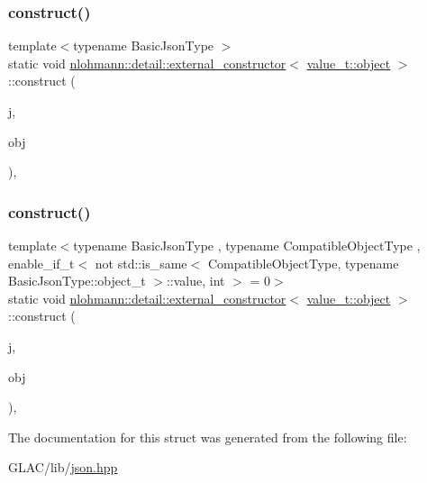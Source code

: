 \subsubsection{\texorpdfstring{construct()}{construct()}\hspace{0.1cm}{\footnotesize\ttfamily [1/2]}}
{\footnotesize\ttfamily template$<$typename Basic\+Json\+Type $>$ \\
static void \mbox{\hyperlink{structnlohmann_1_1detail_1_1external__constructor}{nlohmann\+::detail\+::external\+\_\+constructor}}$<$ \mbox{\hyperlink{namespacenlohmann_1_1detail_a90aa5ef615aa8305e9ea20d8a947980faa8cfde6331bd59eb2ac96f8911c4b666}{value\+\_\+t\+::object}} $>$\+::construct (\begin{DoxyParamCaption}\item[{Basic\+Json\+Type \&}]{j,  }\item[{const typename Basic\+Json\+Type\+::object\+\_\+t \&}]{obj }\end{DoxyParamCaption})\hspace{0.3cm}{\ttfamily [inline]}, {\ttfamily [static]}}

\mbox{\label{structnlohmann_1_1detail_1_1external__constructor_3_01value__t_1_1object_01_4_a91f89abe0ec4dec59099b691682ff927}} 
\subsubsection{\texorpdfstring{construct()}{construct()}\hspace{0.1cm}{\footnotesize\ttfamily [2/2]}}
{\footnotesize\ttfamily template$<$typename Basic\+Json\+Type , typename Compatible\+Object\+Type , enable\+\_\+if\+\_\+t$<$ not std\+::is\+\_\+same$<$ Compatible\+Object\+Type, typename Basic\+Json\+Type\+::object\+\_\+t $>$\+::value, int $>$  = 0$>$ \\
static void \mbox{\hyperlink{structnlohmann_1_1detail_1_1external__constructor}{nlohmann\+::detail\+::external\+\_\+constructor}}$<$ \mbox{\hyperlink{namespacenlohmann_1_1detail_a90aa5ef615aa8305e9ea20d8a947980faa8cfde6331bd59eb2ac96f8911c4b666}{value\+\_\+t\+::object}} $>$\+::construct (\begin{DoxyParamCaption}\item[{Basic\+Json\+Type \&}]{j,  }\item[{const Compatible\+Object\+Type \&}]{obj }\end{DoxyParamCaption})\hspace{0.3cm}{\ttfamily [inline]}, {\ttfamily [static]}}



The documentation for this struct was generated from the following file\+:\begin{DoxyCompactItemize}
\item 
G\+L\+A\+C/lib/\mbox{\hyperlink{json_8hpp}{json.\+hpp}}\end{DoxyCompactItemize}
